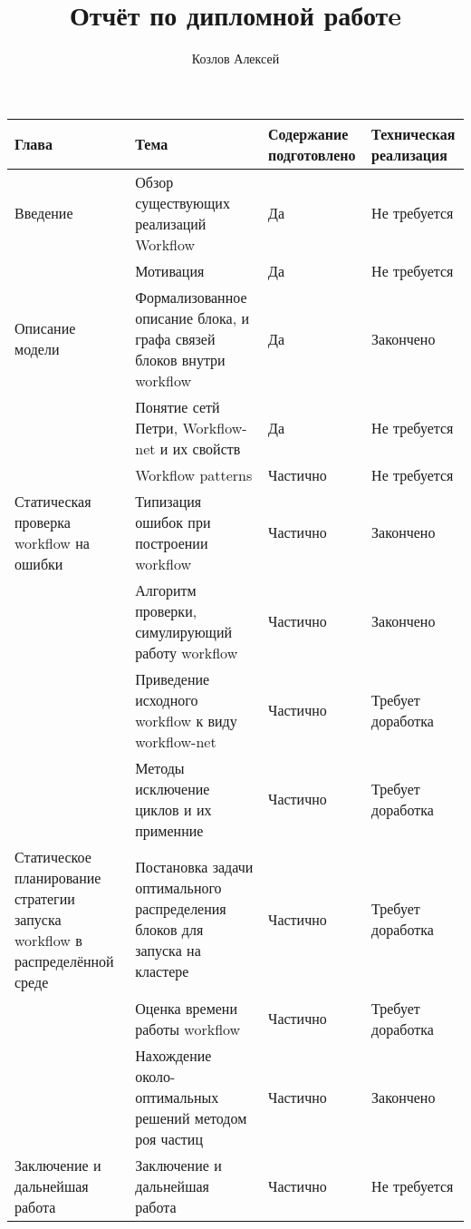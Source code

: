 \documentclass[a4paper,12pt]{article}
\title{Отчёт по дипломной работe}
\author{Козлов Алексей}
\begin{document}
\maketitle
\textwidth 17.5cm
\topmargin -1cm
\parindent 1cm
\textheight 24cm
\parskip 1.5mm


\begin{table}[ht]
\centering 
    \begin{tabular}{|>{\centering}m{3.5cm}| >{\centering}m{5cm} |>{\centering}m{2.5cm}|l|}
     \hline
    Глава & Тема & Содержание подготовлено & Техническая реализация  \\ [0.5ex] \hline \hline
    Введение                       & Обзор существующих реализаций Workflow                                & Да       & Не требуется  \\ \hline
    ~							   & Мотивация 	                							               & Да       & Не требуется  \\ \hline
    Описание  модели               & Формализованное описание блока, и графа связей блоков внутри workflow & Да       & Закончено \\ \hline
    ~				               & Понятие сетй Петри, Workflow-net и их свойств	                       & Да       & Не требуется \\ \hline
    ~				               & Workflow patterns                                                	   & Частично & Не требуется \\ \hline
    Статическая проверка workflow 
    				  на ошибки    & Типизация ошибок при построении workflow                              & Частично & Закончено   \\ \hline
    				               & Алгоритм проверки, симулирующий работу workflow                       & Частично & Закончено   \\ \hline
    ~                              & Приведение исходного workflow к виду workflow-net     				   & Частично & Требует доработка   \\ \hline
    ~                              & Методы исключение циклов и их применние                               & Частично & Требует доработка \\ \hline
    Статическое планирование 
    стратегии запуска workflow 
    в распределённой среде         & Постановка задачи оптимального распределения блоков для запуска 
    																					 на кластере       & Частично & Требует доработка   \\ \hline
    ~                              & Оценка времени работы workflow									       & Частично & Требует доработка   \\ \hline    	
    ~                              & Нахождение около-оптимальных решений методом роя частиц               & Частично & Закончено   \\ \hline
    Заключение и дальнейшая работа & Заключение и дальнейшая работа                                        & Частично & Не требуется \\ \hline
    \end{tabular}
\end{table}
\end{document}
